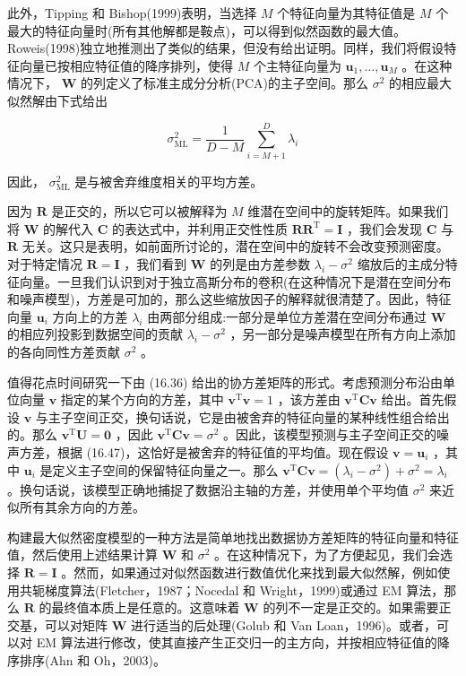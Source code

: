\documentclass[10pt]{report}
\begin{document}
此外，Tipping 和 Bishop(1999)表明，当选择 \(M\) 个特征向量为其特征值是 \(M\) 个最大的特征向量时(所有其他解都是鞍点)，可以得到似然函数的最大值。Roweis(1998)独立地推测出了类似的结果，但没有给出证明。同样，我们将假设特征向量已按相应特征值的降序排列，使得 \(M\) 个主特征向量为 \({\mathbf{u}}_{1},\ldots ,{\mathbf{u}}_{M}\) 。在这种情况下， \(\mathbf{W}\) 的列定义了标准主成分分析(PCA)的主子空间。那么 \({\sigma }^{2}\) 的相应最大似然解由下式给出

\[
{\sigma }_{\mathrm{{ML}}}^{2} = \frac{1}{D - M}\mathop{\sum }\limits_{{i = M + 1}}^{D}{\lambda }_{i} \tag{16.47}
\]

因此， \({\sigma }_{\mathrm{{ML}}}^{2}\) 是与被舍弃维度相关的平均方差。

因为 \(\mathbf{R}\) 是正交的，所以它可以被解释为 \(M\) 维潜在空间中的旋转矩阵。如果我们将 \(\mathbf{W}\) 的解代入 \(\mathbf{C}\) 的表达式中，并利用正交性性质 \(\mathbf{R}{\mathbf{R}}^{\mathrm{T}} = \mathbf{I}\) ，我们会发现 \(\mathbf{C}\) 与 \(\mathbf{R}\) 无关。这只是表明，如前面所讨论的，潜在空间中的旋转不会改变预测密度。对于特定情况 \(\mathbf{R} = \mathbf{I}\) ，我们看到 \(\mathbf{W}\) 的列是由方差参数 \({\lambda }_{i} - {\sigma }^{2}\) 缩放后的主成分特征向量。一旦我们认识到对于独立高斯分布的卷积(在这种情况下是潜在空间分布和噪声模型)，方差是可加的，那么这些缩放因子的解释就很清楚了。因此，特征向量 \({\mathbf{u}}_{i}\) 方向上的方差 \({\lambda }_{i}\) 由两部分组成:一部分是单位方差潜在空间分布通过 \(\mathbf{W}\) 的相应列投影到数据空间的贡献 \({\lambda }_{i} - {\sigma }^{2}\) ，另一部分是噪声模型在所有方向上添加的各向同性方差贡献 \({\sigma }^{2}\) 。

值得花点时间研究一下由 (16.36) 给出的协方差矩阵的形式。考虑预测分布沿由单位向量 \(\mathbf{v}\) 指定的某个方向的方差，其中 \({\mathbf{v}}^{\mathrm{T}}\mathbf{v} = 1\) ，该方差由 \({\mathbf{v}}^{\mathrm{T}}\mathbf{{Cv}}\) 给出。首先假设 \(\mathbf{v}\) 与主子空间正交，换句话说，它是由被舍弃的特征向量的某种线性组合给出的。那么 \({\mathbf{v}}^{\mathrm{T}}\mathbf{U} = \mathbf{0}\) ，因此 \({\mathbf{v}}^{\mathrm{T}}\mathbf{{Cv}} = {\sigma }^{2}\) 。因此，该模型预测与主子空间正交的噪声方差，根据 (16.47)，这恰好是被舍弃的特征值的平均值。现在假设 \(\mathbf{v} = {\mathbf{u}}_{i}\) ，其中 \({\mathbf{u}}_{i}\) 是定义主子空间的保留特征向量之一。那么 \({\mathbf{v}}^{\mathrm{T}}\mathbf{{Cv}} = \left( {{\lambda }_{i} - {\sigma }^{2}}\right)  + {\sigma }^{2} = {\lambda }_{i}\) 。换句话说，该模型正确地捕捉了数据沿主轴的方差，并使用单个平均值 \({\sigma }^{2}\) 来近似所有其余方向的方差。

构建最大似然密度模型的一种方法是简单地找出数据协方差矩阵的特征向量和特征值，然后使用上述结果计算 \(\mathbf{W}\) 和 \({\sigma }^{2}\) 。在这种情况下，为了方便起见，我们会选择 \(\mathbf{R} = \mathbf{I}\) 。然而，如果通过对似然函数进行数值优化来找到最大似然解，例如使用共轭梯度算法(Fletcher，1987；Nocedal 和 Wright，1999)或通过 EM 算法，那么 \(\mathbf{R}\) 的最终值本质上是任意的。这意味着 \(\mathbf{W}\) 的列不一定是正交的。如果需要正交基，可以对矩阵 \(\mathbf{W}\) 进行适当的后处理(Golub 和 Van Loan，1996)。或者，可以对 EM 算法进行修改，使其直接产生正交归一的主方向，并按相应特征值的降序排序(Ahn 和 Oh，2003)。
\end{document}
